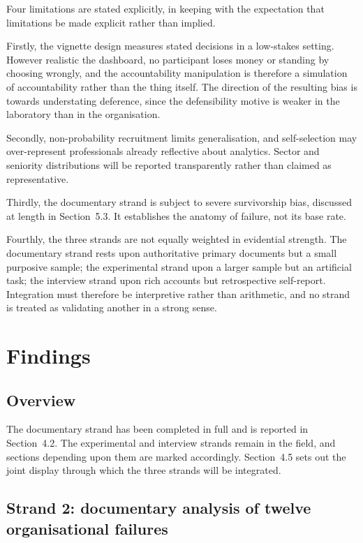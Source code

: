 \documentclass[11pt,a4paper]{article}
\numberwithin{figure}{section}
\numberwithin{table}{section}
\begin{document}
Four limitations are stated explicitly, in keeping with the expectation that limitations be made explicit
rather than implied.

Firstly, the vignette design measures stated decisions in a low-stakes setting. However realistic the
dashboard, no participant loses money or standing by choosing wrongly, and the accountability manipulation
is therefore a simulation of accountability rather than the thing itself. The direction of the resulting
bias is towards understating deference, since the defensibility motive is weaker in the laboratory than in
the organisation.

Secondly, non-probability recruitment limits generalisation, and self-selection may over-represent
professionals already reflective about analytics. Sector and seniority distributions will be reported
transparently rather than claimed as representative.

Thirdly, the documentary strand is subject to severe survivorship bias, discussed at length in
Section~5.3. It establishes the anatomy of failure, not its base rate.

Fourthly, the three strands are not equally weighted in evidential strength. The documentary strand rests
upon authoritative primary documents but a small purposive sample; the experimental strand upon a larger
sample but an artificial task; the interview strand upon rich accounts but retrospective self-report.
Integration must therefore be interpretive rather than arithmetic, and no strand is treated as validating
another in a strong sense.

\section{Findings}

\subsection{Overview}

The documentary strand has been completed in full and is reported in Section~4.2. The experimental and
interview strands remain in the field, and sections depending upon them are marked accordingly.
Section~4.5 sets out the joint display through which the three strands will be integrated.

\subsection{Strand 2: documentary analysis of twelve organisational failures}
\end{document}
